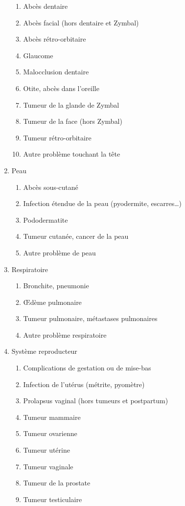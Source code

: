 \documentclass[a4paper,10pt]{article}
\begin{document}
\begin{enumerate}
\begin{enumerate}
\item Abcès dentaire
\item Abcès facial (hors dentaire et Zymbal)
\item Abcès rétro-orbitaire
\item Glaucome
\item Malocclusion dentaire
\item Otite, abcès dans l'oreille
\item Tumeur de la glande de Zymbal
\item Tumeur de la face (hors Zymbal)
\item Tumeur rétro-orbitaire
\item Autre problème touchant la tête
\end{enumerate}
\item Peau
\begin{enumerate}
\item Abcès sous-cutané
\item Infection étendue de la peau (pyodermite, escarres…)
\item Pododermatite
\item Tumeur cutanée, cancer de la peau
\item Autre problème de peau
\end{enumerate}
\item Respiratoire
\begin{enumerate}
\item Bronchite, pneumonie
\item Œdème pulmonaire
\item Tumeur pulmonaire, métastases pulmonaires
\item Autre problème respiratoire
\end{enumerate}
\item Système reproducteur
\begin{enumerate}
\item Complications de gestation ou de mise-bas
\item Infection de l'utérus (métrite, pyomètre)
\item Prolapsus vaginal (hors tumeurs et postpartum)
\item Tumeur mammaire
\item Tumeur ovarienne
\item Tumeur utérine
\item Tumeur vaginale
\item Tumeur de la prostate
\item Tumeur testiculaire

\end{enumerate}
\end{enumerate}
\end{document}
